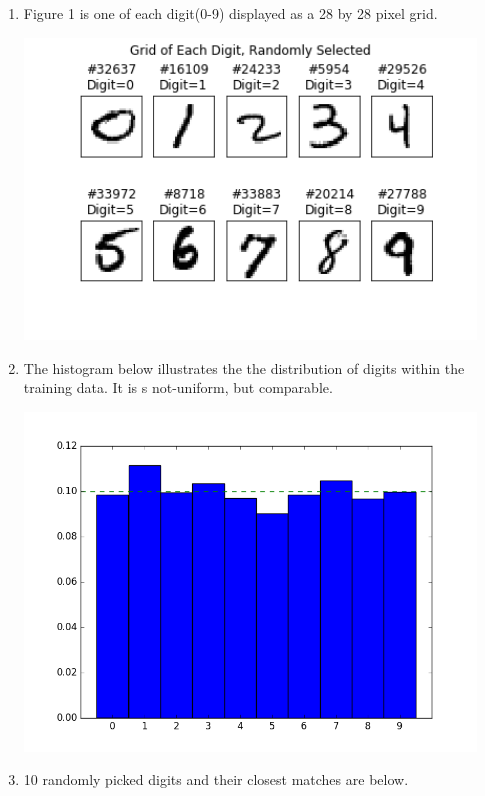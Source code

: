 \documentclass{report}
\begin{document}
\begin{enumerate}
\begin{enumerate}[label=(\alph*)]
		\item Figure 1 is one of each digit(0-9) displayed as a 28 by 28 pixel grid.  
		\begin{center}
		\includegraphics[width=12cm]{images/one_grid_x_each_digit.png}
		\end{center}
		\item The histogram below illustrates the the distribution of digits within the training data. It is s not-uniform, but comparable. 
		\begin{center}
		\includegraphics[width=12cm]{images/distrib.png}
		\end{center}
		
		\newpage
		
		\item 10 randomly picked digits and their closest matches are below.
		

\end{enumerate}
\end{enumerate}
\end{document}
